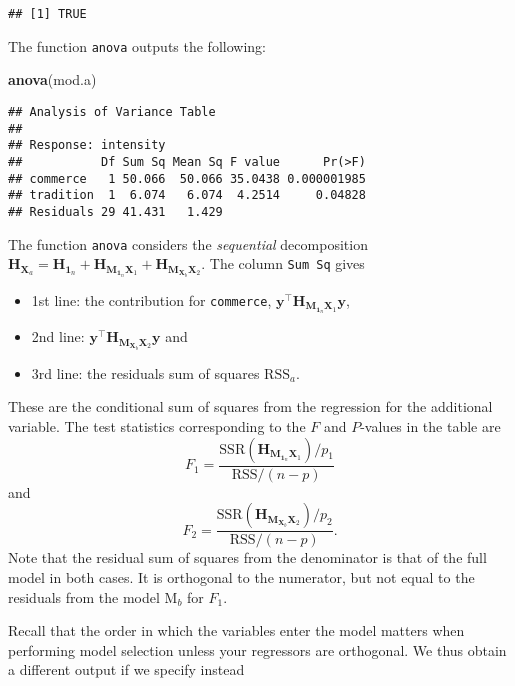 \documentclass[]{book}
\newenvironment{Shaded}{\begin{snugshade}}{\end{snugshade}}
\newcommand{\KeywordTok}[1]{\textcolor[rgb]{0.13,0.29,0.53}{\textbf{#1}}}
\newcommand{\NormalTok}[1]{#1}
\providecommand{\tightlist}{%
  \setlength{\itemsep}{0pt}\setlength{\parskip}{0pt}}
\theoremstyle{definition}
\theoremstyle{definition}
\theoremstyle{definition}
\theoremstyle{remark}
\begin{document}
\begin{verbatim}
## [1] TRUE
\end{verbatim}

The function \texttt{anova} outputs the following:

\begin{Shaded}
\begin{Highlighting}[]
\KeywordTok{anova}\NormalTok{(mod.a)}
\end{Highlighting}
\end{Shaded}

\begin{verbatim}
## Analysis of Variance Table
## 
## Response: intensity
##           Df Sum Sq Mean Sq F value      Pr(>F)
## commerce   1 50.066  50.066 35.0438 0.000001985
## tradition  1  6.074   6.074  4.2514     0.04828
## Residuals 29 41.431   1.429
\end{verbatim}

The function \texttt{anova} considers the \emph{sequential}
decomposition
\(\mathbf{H}_{\mathbf{X}_a}=\mathbf{H}_{\mathbf{1}_n} + \mathbf{H}_{\mathbf{M}_{\mathbf{1}_n}\mathbf{X}_1} + \mathbf{H}_{\mathbf{M}_{\mathbf{X}_b}\mathbf{X}_2}\).
The column \texttt{Sum\ Sq} gives

\begin{itemize}
\tightlist
\item
  1st line: the contribution for \texttt{commerce},
  \(\boldsymbol{y}^\top\mathbf{H}_{\mathbf{M}_{\mathbf{1}_n}\mathbf{X}_1}\boldsymbol{y}\),
\item
  2nd line:
  \(\boldsymbol{y}^\top\mathbf{H}_{\mathbf{M}_{\mathbf{X}_b}\mathbf{X}_2}\boldsymbol{y}\)
  and
\item
  3rd line: the residuals sum of squares \(\mathrm{RSS}_a\).
\end{itemize}

These are the conditional sum of squares from the regression for the
additional variable. The test statistics corresponding to the \(F\) and
\(P\)-values in the table are
\[F_1 = \frac{\mathrm{SSR}(\mathbf{H}_{\mathbf{M}_{\mathbf{1}_n}\mathbf{X}_1})/p_1}{\mathrm{RSS}/(n-p)}\]
and
\[F_2 = \frac{\mathrm{SSR}(\mathbf{H}_{\mathbf{M}_{\mathbf{X}_b}\mathbf{X}_2})/p_2}{\mathrm{RSS}/(n-p)}.\]
Note that the residual sum of squares from the denominator is that of
the full model in both cases. It is orthogonal to the numerator, but not
equal to the residuals from the model \(\mathrm{M}_b\) for \(F_1\).

Recall that the order in which the variables enter the model matters
when performing model selection unless your regressors are orthogonal.
We thus obtain a different output if we specify instead
\end{document}
